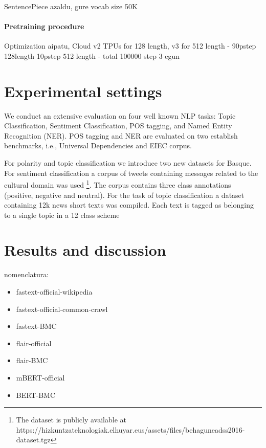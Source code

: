 \documentclass[10pt, a4paper]{article}
\begin{document}
SentencePiece azaldu,  gure vocab size 50K

\paragraph{Pretraining procedure}

Optimization aipatu, Cloud v2 TPUs for 128 length, v3 for 512 length - 90pstep 128length 10pstep 512 length - total 100000 step 3 egun


\section{Experimental settings}
\label{sec:exper-sett}

We conduct an extensive evaluation on four well known NLP tasks: Topic Classification, Sentiment Classification, POS tagging, and Named Entity Recognition (NER). POS tagging and NER are evaluated on two establish benchmarks, i.e., Universal Dependencies and EIEC corpus. 

For polarity and topic classification we introduce two new datasets for Basque. For sentiment classification a corpus of tweets containing messages related to the cultural domain was used \cite{san2019multilingual}\footnote{The dataset is publicly available at https://hizkuntzateknologiak.elhuyar.eus/assets/files/behaguneadss2016-dataset.tgz}. The corpus contains three class annotations (positive, negative and neutral). For the task of topic classification a dataset containing 12k news short texts was compiled. Each text is tagged as belonging to a single topic in a 12 class scheme



\section{Results and discussion}
\label{sec:results-discussion}

nomenclatura: \begin{itemize}
    \item fastext-official-wikipedia 
    \item fastext-official-common-crawl 
    \item fastext-BMC
    \item flair-official
    \item flair-BMC
    \item mBERT-official
    \item BERT-BMC
\end{itemize}
\end{document}
